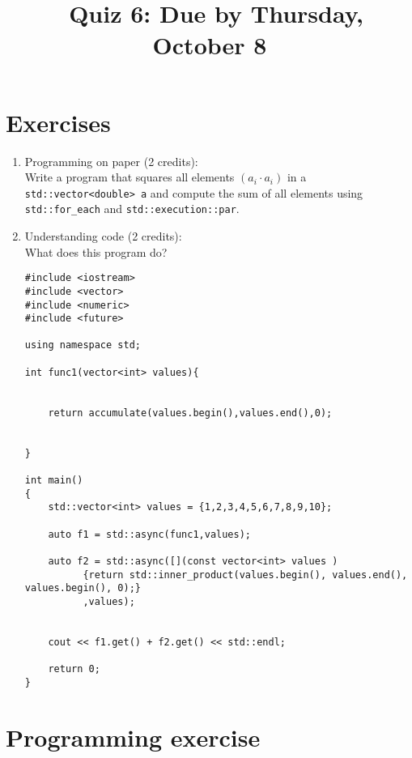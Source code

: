 \documentclass[11pt]{article}
\begin{document}
\title{\coursename~Quiz 6: Due by Thursday, October 8}
\date{}
\maketitle

\medskip


\section*{Exercises}

\begin{enumerate}
\item Programming on paper (2 credits): \\
Write a program that squares all elements $(a_i \cdot a_i)$ in a \lstinline|std::vector<double> a| and compute the sum of all elements using \lstinline|std::for_each| and \lstinline|std::execution::par|.


\item Understanding code (2 credits): \\
What does this program do?
\begin{lstlisting}
#include <iostream>
#include <vector>
#include <numeric>
#include <future>

using namespace std;

int func1(vector<int> values){
    
    
    return accumulate(values.begin(),values.end(),0);
    
    
}

int main()
{
    std::vector<int> values = {1,2,3,4,5,6,7,8,9,10};
    
    auto f1 = std::async(func1,values);
    
    auto f2 = std::async([](const vector<int> values )
          {return std::inner_product(values.begin(), values.end(), values.begin(), 0);}
          ,values);
    
    
    cout << f1.get() + f2.get() << std::endl;

    return 0;
}
\end{lstlisting}


\end{enumerate}

\section*{Programming exercise}
\end{document}

